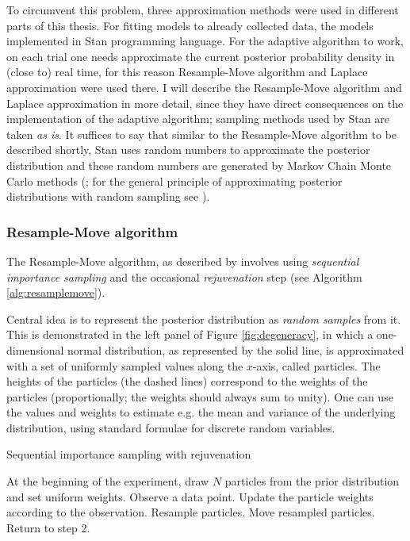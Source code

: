 \documentclass{article}\usepackage{knitr}
\begin{document}
To circumvent this problem, three approximation methods were used in different parts of this thesis. For fitting models to already collected data, the models implemented in Stan programming language. For the adaptive algorithm to work, on each trial one needs approximate the current posterior probability density in (close to) real time, for this reason Resample-Move algorithm and Laplace approximation were used there. I will describe the Resample-Move algorithm and Laplace approximation in more detail, since they have direct consequences on the implementation of the adaptive algorithm; sampling methods used by Stan are taken \textit{as is}. It suffices to say that similar to the Resample-Move algorithm to be described shortly, Stan uses random numbers to approximate the posterior distribution and these random numbers are generated by Markov Chain Monte Carlo methods (\citet[Chapters 15 \& 16]{stan_manual_new}; for the general principle of approximating posterior distributions with random sampling see \citet[Chapter 7]{kruschke2015}).

\subsubsection{Resample-Move algorithm}

The Resample-Move algorithm, as described by \citet{chopin2002} involves using \textit{sequential importance sampling} and the occasional \textit{rejuvenation} step (see Algorithm \ref{alg:resamplemove}).  

Central idea is to represent the posterior distribution as \textit{random samples} from it. This is demonstrated in the left panel of Figure \ref{fig:degeneracy}, in which a one-dimensional normal distribution, as represented by the solid line, is approximated with a set of uniformly sampled values along the $x$-axis, called particles. The heights of the particles (the dashed lines) correspond to the weights of the particles (proportionally; the weights should always sum to unity). One can use the values and weights to estimate e.g. the mean and variance of the underlying distribution, using standard formulae for discrete random variables.

\begin{algorithm}
\caption{Sequential importance sampling with rejuvenation}
\label{alg:resamplemove}
\begin{algorithmic}[1]

\State At the beginning of the experiment, draw $N$ particles from the prior distribution and set uniform weights.
\State Observe a data point.
\State Update the particle weights according to the observation.
        \State Resample particles.
        \State Move resampled particles.
    \EndIf
\State Return to step 2.

\end{algorithmic}
\end{algorithm}
\end{document}
